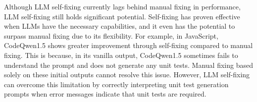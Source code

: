 Although LLM self-fixing currently lags behind manual fixing in performance, LLM self-fixing still holds significant potential. Self-fixing has proven effective when LLMs have the necessary capabilities, and it even has the potential to surpass manual fixing due to its flexibility. For example, in JavaScript, CodeQwen1.5 shows greater improvement through self-fixing compared to manual fixing. This is because, in its vanilla output, CodeQwen1.5 sometimes fails to understand the prompt and does not generate any unit tests. Manual fixing based solely on these initial outputs cannot resolve this issue. However, LLM self-fixing can overcome this limitation by correctly interpreting unit test generation prompts when error messages indicate that unit tests are required.
% 



